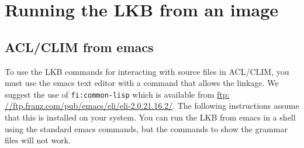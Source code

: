 \documentclass[12pt]{report}
\newcommand{\functionname}[1]{{\tt #1}}
\begin{document}
\section{Running the LKB from an image}
\label{images}


\subsection{ACL/CLIM from emacs}
\label{emacs-clim-image}
To use the LKB commands for interacting with source
files in ACL/CLIM, you must use the emacs text editor with 
a command that allows the linkage.  We suggest
the use of \functionname{fi:common-lisp} which is available
from \href{ftp: //ftp.franz.com/pub/emacs/eli/eli-2.0.21.16.2/}{ftp: //ftp.franz.com/pub/emacs/eli/eli-2.0.21.16.2/}.  The following
instructions assume that this is installed on your system.
You can run the LKB from emacs in a shell using the standard
emacs commands, but the commands to show the grammar files
will not work.
\end{document}
